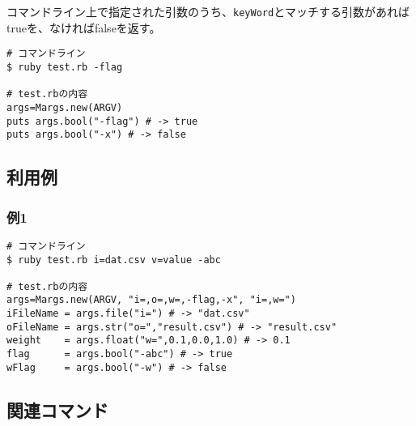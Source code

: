 コマンドライン上で指定された引数のうち、\verb/keyWord/とマッチする引数があればtrueを、なければfalseを返す。

\begin{Verbatim}[baselinestretch=0.7,frame=single]
# コマンドライン
$ ruby test.rb -flag

# test.rbの内容
args=Margs.new(ARGV)
puts args.bool("-flag") # -> true
puts args.bool("-x") # -> false
\end{Verbatim}



\subsection{利用例}
\subsubsection*{例1}


\begin{Verbatim}[baselinestretch=0.7,frame=single]
# コマンドライン
$ ruby test.rb i=dat.csv v=value -abc

# test.rbの内容
args=Margs.new(ARGV, "i=,o=,w=,-flag,-x", "i=,w=")
iFileName = args.file("i=") # -> "dat.csv"
oFileName = args.str("o=","result.csv") # -> "result.csv"
weight    = args.float("w=",0.1,0.0,1.0) # -> 0.1
flag      = args.bool("-abc") # -> true
wFlag     = args.bool("-w") # -> false
\end{Verbatim}

\subsection{関連コマンド}


%

